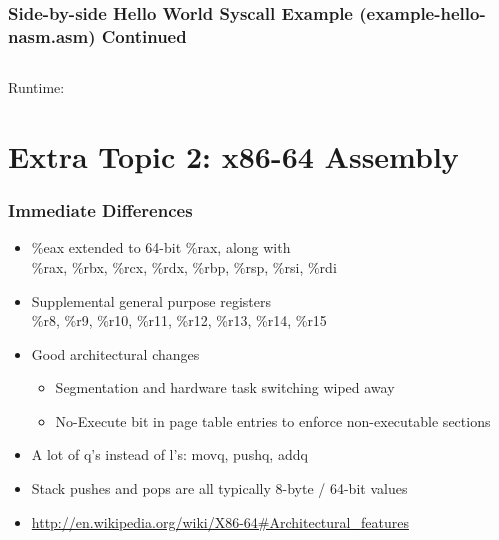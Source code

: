 \documentclass[11pt,xcolor=dvipsnames]{beamer}
\newcommand{\vs}{\vspace{0.5em}}
\newcommand{\mvs}{\vspace{-0.95em}}
\begin{document}
\begin{frame}[fragile,t]
\frametitle{Side-by-side Hello World Syscall Example (example-hello-nasm.asm) Continued}
\mvs
\begin{columns}[T]
\end{columns}
\vs
{\footnotesize Runtime:}
\end{frame}

\section{Extra Topic 2: x86-64 Assembly}

\begin{frame}[fragile,t]
\frametitle{Immediate Differences}
\begin{itemize}
  \item {\ttfamily \%eax} extended to 64-bit {\ttfamily \%rax}, along with \\
  {\ttfamily \%rax, \%rbx, \%rcx, \%rdx, \%rbp, \%rsp, \%rsi, \%rdi}
  \item Supplemental general purpose registers \\
  {\ttfamily \%r8, \%r9, \%r10, \%r11, \%r12, \%r13, \%r14, \%r15}
  \vs \vs
  \item Good architectural changes
  \begin{itemize}
    \item Segmentation and hardware task switching wiped away
    \item No-Execute bit in page table entries to enforce non-executable sections
  \end{itemize}
  \vs
  \item A lot of q's instead of l's: {\ttfamily movq, pushq, addq}
  \item Stack pushes and pops are all typically 8-byte / 64-bit values
  \item {\small \url{http://en.wikipedia.org/wiki/X86-64#Architectural\_features}}
\end{itemize}
\end{frame}
\end{document}
